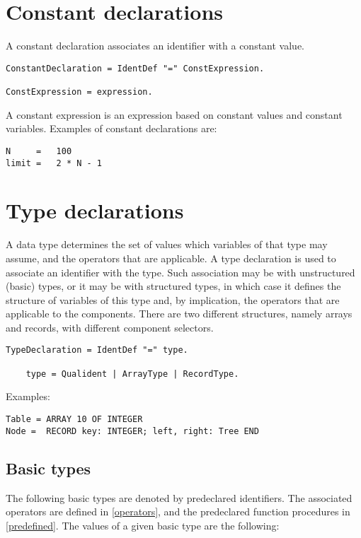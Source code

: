 \documentclass[12pt]{article}
\begin{document}
\section{Constant declarations}

A constant declaration associates an identifier with a constant value.

\begin{lstlisting}[style=ebnf]
ConstantDeclaration = IdentDef "=" ConstExpression. 

ConstExpression = expression.
\end{lstlisting}

A constant expression is an expression based on constant values and constant variables. Examples of constant declarations are:

\begin{lstlisting}[style=example]
N     =   100
limit =   2 * N - 1
\end{lstlisting}

\section{Type declarations}
\label{types}

A data type determines the set of values which variables of that type may assume, and the operators that are applicable. A type declaration is used to associate an identifier with the type. Such association may be with unstructured (basic) types, or it may be with structured types, in which case it defines the structure of variables of this type and, by implication, the operators that are applicable to the components. There are two different structures, namely arrays and records, with different component selectors.

\begin{lstlisting}[style=ebnf]
    TypeDeclaration = IdentDef "=" type.

    type = Qualident | ArrayType | RecordType.
\end{lstlisting}

Examples:

\begin{lstlisting}[style=example]
Table = ARRAY 10 OF INTEGER
Node =  RECORD key: INTEGER; left, right: Tree END
\end{lstlisting}

\subsection{Basic types}
\label{types-basic}
The following basic types are denoted by predeclared identifiers. The associated operators are defined in \ref{operators}, and the predeclared function procedures in \ref{predefined}. The values of a given basic type are the following:
\end{document}

